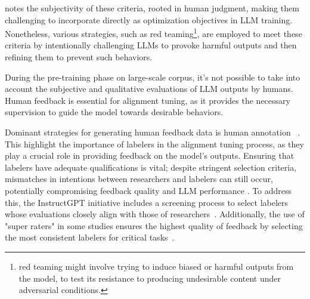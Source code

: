 \textcite{survey} notes the subjectivity of these criteria, rooted in human judgment, making them challenging to incorporate directly as optimization objectives in LLM training.
Nonetheless, various strategies, such as red teaming\footnote{red teaming might involve trying to induce biased or harmful outputs from the model, to test its resistance to producing undesirable content under adversarial conditions.}, are employed to meet these criteria by intentionally challenging LLMs to provoke harmful outputs and then refining them to prevent such behaviors.

During the pre-training phase on large-scale corpus, it's not possible to take into account the subjective and qualitative evaluations of LLM outputs by humans.
Human feedback is essential for alignment tuning, as it provides the necessary supervision to guide the model towards desirable behaviors.

Dominant strategies for generating human feedback data is human annotation ~\cite{ouyang2022training, glaese2022improving, ziegler2019fine}.
This highlight the importance of labelers in the alignment tuning process, as they play a crucial role in providing feedback on the model's outputs.
Ensuring that labelers have adequate qualifications is vital; despite stringent selection criteria, mismatches in intentions between researchers and labelers can still occur, potentially compromising feedback quality and LLM performance \cite{bender2021dangers}.
To address this, the InstructGPT initiative includes a screening process to select labelers whose evaluations closely align with those of researchers~\cite{ouyang2022training}.
Additionally, the use of "super raters" in some studies ensures the highest quality of feedback by selecting the most consistent labelers for critical tasks~\cite{glaese2022improving}.

